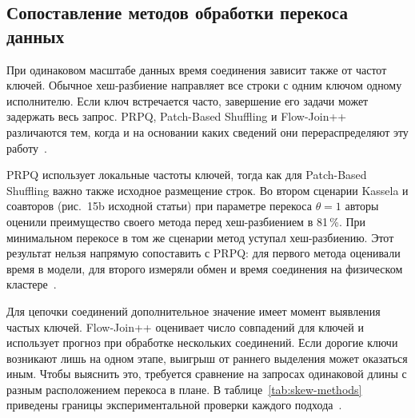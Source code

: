 \documentclass[a4paper, final]{article}
\begin{document}
	\subsection{Сопоставление методов обработки перекоса данных}
	
	При одинаковом масштабе данных время соединения зависит также от частот ключей. Обычное хеш-разбиение направляет все строки с одним ключом одному исполнителю. Если ключ встречается часто, завершение его задачи может задержать весь запрос. PRPQ, Patch-Based Shuffling и Flow-Join++ различаются тем, когда и на основании каких сведений они перераспределяют эту работу~\cite{prpq2017,kassela2025,flowjoin2026}.
	
	PRPQ использует локальные частоты ключей, тогда как для Patch-Based Shuffling важно также исходное размещение строк. Во втором сценарии Kassela и соавторов (рис.~15b исходной статьи) при параметре перекоса $\theta=1$ авторы оценили преимущество своего метода перед хеш-разбиением в 81\,\%. При минимальном перекосе в том же сценарии метод уступал хеш-разбиению. Этот результат нельзя напрямую сопоставить с PRPQ: для первого метода оценивали время в модели, для второго измеряли обмен и время соединения на физическом кластере~\cite{kassela2025,prpq2017}.
	
	Для цепочки соединений дополнительное значение имеет момент выявления частых ключей. Flow-Join++ оценивает число совпадений для ключей и использует прогноз при обработке нескольких соединений. Если дорогие ключи возникают лишь на одном этапе, выигрыш от раннего выделения может оказаться иным. Чтобы выяснить это, требуется сравнение на запросах одинаковой длины с разным расположением перекоса в плане. В таблице~\ref{tab:skew-methods} приведены границы экспериментальной проверки каждого подхода~\cite{prpq2017,kassela2025,flowjoin2026}.
	
\end{document}
